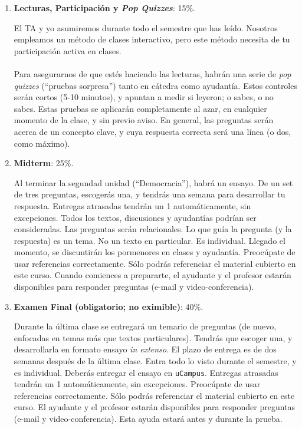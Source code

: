 \documentclass[letterpaper]{article}
\begin{document}
\begin{enumerate}

	\item {\bf Lecturas, Participaci\'on y \emph{Pop Quizzes}}: 15\%.

		El TA y yo asumiremos durante todo el semestre que has le\'ido. Nosotros empleamos un m\'etodo de clases interactivo, pero este m\'etodo necesita de tu participaci\'on activa en clases.
		\\
		\\	
		Para asegurarnos de que est\'es haciendo las lecturas, habr\'an una serie de \emph{pop quizzes} (``pruebas sorpresa'') tanto en c\'atedra como ayudant\'ia. Estos controles ser\'an cortos (5-10 minutos), y apuntan a medir si leyeron; o sabes, o no sabes. Estas pruebas se aplicar\'an completamente al azar, en cualquier momento de la clase, y sin previo aviso. En general, las preguntas ser\'an acerca de un concepto clave, y cuya respuesta correcta ser\'a una l\'inea (o dos, como m\'aximo).

	\item {\bf Midterm}: 25\%.

		Al terminar la segundad unidad (``Democracia''), habr\'a un ensayo. De un set de tres preguntas, escoger\'as una, y tendr\'as una semana para desarrollar tu respuesta. Entregas atrasadas tendr\'an un 1 autom\'aticamente, sin excepciones. Todos los textos, discusiones y ayudant\'ias podr\'ian ser consideradas. Las preguntas ser\'an relacionales. Lo que gu\'ia la pregunta (y la respuesta) es un tema. No un texto en particular. Es individual. Llegado el momento, se discuntir\'an los pormenores en clases y ayudant\'ia. Preoc\'upate de usar referencias correctamente. S\'olo podr\'as referenciar el material cubierto en este curso. Cuando comiences a prepararte, el ayudante y el profesor estar\'an disponibles para responder preguntas (e-mail y video-conferencia).

	\item {\bf Examen Final (obligatorio; no eximible)}: 40\%. 

	Durante la \'ultima clase se entregar\'a un temario de preguntas (de nuevo, enfocadas en temas m\'as que textos particulares). Tendr\'as que escoger una, y desarrollarla en formato ensayo \emph{in extenso}. El plazo de entrega es de dos semanas despu\'es de la \'ultima clase. Entra todo lo visto durante el semestre, y es individual. Deber\'as entregar el ensayo en \texttt{uCampus}. Entregas atrasadas tendr\'an un 1 autom\'aticamente, sin excepciones. Preoc\'upate de usar referencias correctamente. S\'olo podr\'as referenciar el material cubierto en este curso. El ayudante y el profesor estar\'an disponibles para responder preguntas (e-mail y video-conferencia). Esta ayuda estar\'a antes y durante la prueba.






\end{enumerate}
\end{document}
